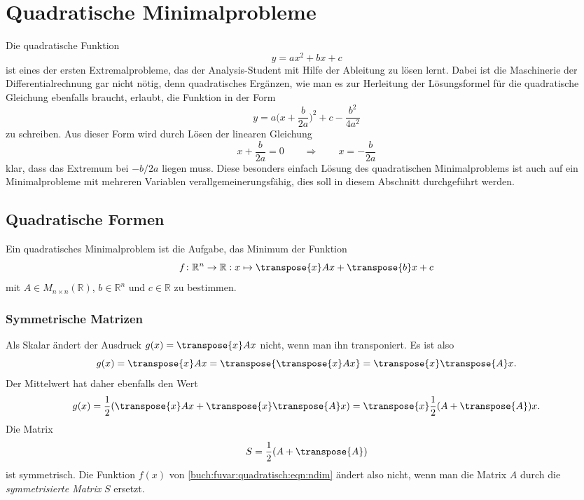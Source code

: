 %
%
%
\section{Quadratische Minimalprobleme
\label{buch:fuvar:section:quadratisch}}
Die quadratische Funktion
\begin{equation}
y
=
ax^2 + bx + c
\label{buch:fuvar:quadratisch:eqn:1dim}
\end{equation}
ist eines der ersten Extremalprobleme, das der Analysis-Student mit
Hilfe der Ableitung zu lösen lernt.
Dabei ist die Maschinerie der Differentialrechnung gar nicht nötig,
denn quadratisches Ergänzen, wie man es zur Herleitung der Lösungsformel
für die quadratische Gleichung ebenfalls braucht, erlaubt, die Funktion
in der Form
\[
y
=
a\biggl(x+\frac{b}{2a}\biggr)^2
+c
-\frac{b^2}{4a^2}
\]
zu schreiben.
Aus dieser Form wird durch Lösen der linearen Gleichung
\[
x+\frac{b}{2a} = 0
\qquad\Rightarrow\qquad
x = -\frac{b}{2a}
\]
klar, dass das Extremum bei $-b/2a$ liegen muss.
Diese besonders einfach Lösung des quadratischen Minimalproblems
ist auch auf ein Minimalprobleme mit mehreren Variablen
verallgemeinerungsfähig, dies soll in diesem Abschnitt durchgeführt
werden.

%
%
\subsection{Quadratische Formen}
Ein quadratisches Minimalproblem ist die Aufgabe, das Minimum der
Funktion
\begin{equation}
f
\colon
\mathbb{R}^n \to \mathbb{R}
:
x\mapsto \transpose{x} A x + \transpose{b} x + c
\label{buch:fuvar:quadratisch:eqn:ndim}
\end{equation}
mit $A\in M_{n\times n}(\mathbb{R})$, $b\in\mathbb{R}^n$ und $c\in\mathbb{R}$
zu bestimmen.

%
%
\subsubsection{Symmetrische Matrizen}
Als Skalar ändert der Ausdruck $g(x) = \transpose{x}Ax$  nicht, wenn man ihn
transponiert.
Es ist also
\[
g(x)
=
\transpose{x}Ax
=
\transpose{\transpose{x}Ax}
=
\transpose{x}\transpose{A}x.
\]
Der Mittelwert hat daher ebenfalls den Wert
\[
g(x)
=
\frac12(\transpose{x}Ax+\transpose{x}\transpose{A}x)
=
\transpose{x}\frac12(A+\transpose{A})x.
\]
Die Matrix
\[
S=\frac12(A+\transpose{A})
\]
ist symmetrisch.
Die Funktion $f(x)$ von \eqref{buch:fuvar:quadratisch:eqn:ndim}
ändert also nicht, wenn man die Matrix $A$ durch die {\em symmetrisierte
Matrix} $S$ ersetzt.

